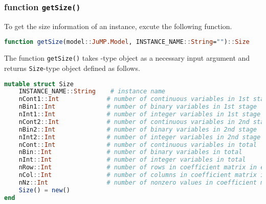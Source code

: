 \subsubsection{function \texttt{getSize()}}
To get the size information of an instance, excute the following function.
\begin{lstlisting}[frame=single,language=julia]
function getSize(model::JuMP.Model, INSTANCE_NAME::String="")::Size
\end{lstlisting}
The function \texttt{getSize()} takes \jumpmodel-type object as a necessary input argument and returns \texttt{Size}-type object defined as follows.
\begin{lstlisting}[frame=single,language=julia]
mutable struct Size
	INSTANCE_NAME::String    # instance name
	nCont1::Int             # number of continuous variables in 1st stage
	nBin1::Int              # number of binary variables in 1st stage
	nInt1::Int              # number of integer variables in 1st stage
	nCont2::Int             # number of continuous variables in 2nd stage    
	nBin2::Int              # number of binary variables in 2nd stage
	nInt2::Int              # number of integer variables in 2nd stage    
	nCont::Int              # number of continuous variables in total      
	nBin::Int               # number of binary variables in total      
	nInt::Int               # number of integer variables in total      
	nRow::Int               # number of rows in coefficient matrix in extensive form
	nCol::Int               # number of columns in coefficient matrix in extensive form
	nNz::Int                # number of nonzero values in coefficient matrix in extensive form
	Size() = new()
end
\end{lstlisting}

